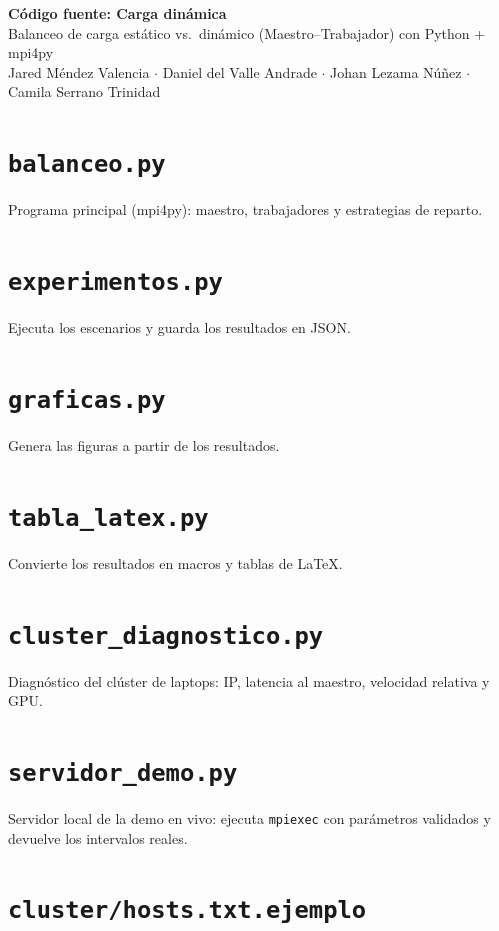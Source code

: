 \documentclass[9pt,a4paper]{article}
\begin{document}
\begin{center}{\Large\bfseries C\'odigo fuente: Carga din\'amica}\\[2pt]
Balanceo de carga est\'atico vs.\ din\'amico (Maestro--Trabajador) con Python + mpi4py\\[2pt]
\small Jared M\'endez Valencia $\cdot$ Daniel del Valle Andrade $\cdot$ Johan Lezama N\'u\~nez $\cdot$ Camila Serrano Trinidad\end{center}
\tableofcontents
\section{\texttt{balanceo.py}}
Programa principal (mpi4py): maestro, trabajadores y estrategias de reparto.

\clearpage
\section{\texttt{experimentos.py}}
Ejecuta los escenarios y guarda los resultados en JSON.

\clearpage
\section{\texttt{graficas.py}}
Genera las figuras a partir de los resultados.

\clearpage
\section{\texttt{tabla\_latex.py}}
Convierte los resultados en macros y tablas de LaTeX.

\clearpage
\section{\texttt{cluster\_diagnostico.py}}
Diagn\'ostico del cl\'uster de laptops: IP, latencia al maestro, velocidad relativa y GPU.

\clearpage
\section{\texttt{servidor\_demo.py}}
Servidor local de la demo en vivo: ejecuta \texttt{mpiexec} con par\'ametros validados y devuelve los intervalos reales.

\clearpage
\section{\texttt{cluster/hosts.txt.ejemplo}}

\end{document}
